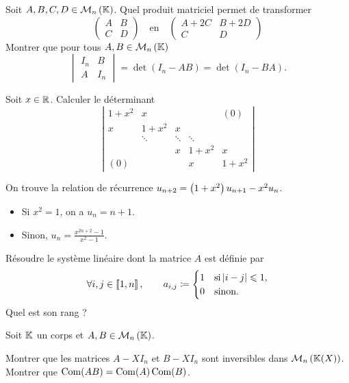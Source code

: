 \documentclass{magnolia}
\begin{document}
\begin{questions}
\question Soit $A,B,C,D\in\mathcal{M}_{n}\left(\mathbb{K}\right)$. Quel produit matriciel permet de transformer
  \[\begin{pmatrix}A & B\\ C&D\end{pmatrix} \quad\text{en}\quad
    \begin{pmatrix}A+2C & B+2D\\ C&D\end{pmatrix}\]
\question Montrer que pour tous $A,B\in\mathcal{M}_{n}\left(\mathbb{K}\right)$
  \[\begin{vmatrix}I_n & B\\A & I_n\end{vmatrix} = \det(I_n - AB)=\det(I_n-BA).\]
\end{questions}



Soit $x\in\mathbb{R}$. Calculer le déterminant
\[\left|
\begin{array}{ccccc}
1+x^2 & x &  & & (0)\\
x & 1+x^2 & x & & \\
  & \ddots & \ddots & \ddots & \\
  &   & x & 1+x^2 & x\\
(0)  & &  & x & 1+x^2
\end{array}
\right|\]
\begin{sol}
On trouve la relation de récurrence $u_{n+2}=\left(1+x^2\right)u_{n+1}-x^2 u_n$.\begin{itemize}
\item Si $x^2=1$, on a $u_n=n+1$.
\item Sinon, $u_n=\frac{x^{2n+2}-1}{x^2-1}$.
\end{itemize}
\end{sol}



Résoudre le système linéaire dont la matrice $A$ est définie par
\[\forall i,j\in\left\llbracket 1,n\right\rrbracket,\quad \quad a_{i,j}\coloneqq
  \begin{cases}
  1 & \text{si} \left|i-j\right|\leqslant 1,\\
  0 & \text{sinon.}
  \end{cases}\]
Quel est son rang ?





Soit $\mathbb{K}$ un corps et $A,B\in\mathcal{M}_{n}\left(\mathbb{K}\right)$.
\begin{questions}
\question Montrer que les matrices $A-X I_n$ et $B-XI_n$ sont inversibles dans
  $\mat{n}{\fracK}$.
\question Montrer que $\mathop{\rm Com}(AB)=\mathop{\rm Com}(A)\mathop{\rm Com}(B)$.
\end{questions}
\end{document}

